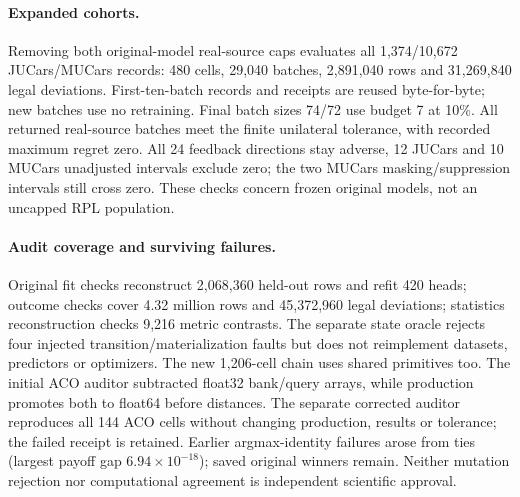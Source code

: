 \documentclass[11pt]{article}
\begin{document}
\paragraph{Expanded cohorts.}
Removing both original-model real-source caps evaluates all 1,374/10,672
JUCars/MUCars records: 480 cells, 29,040 batches, 2,891,040 rows and
31,269,840 legal deviations. First-ten-batch records and receipts are reused
byte-for-byte; new batches use no retraining. Final batch sizes 74/72 use
budget 7 at 10\%. All returned real-source batches meet the finite unilateral
tolerance, with recorded maximum regret zero. All 24 feedback directions stay
adverse, 12 JUCars and 10 MUCars unadjusted intervals exclude zero; the two
MUCars masking/suppression intervals still cross zero. These checks concern
frozen original models, not an uncapped RPL population.

\paragraph{Audit coverage and surviving failures.}
Original fit checks reconstruct 2,068,360 held-out rows and refit 420 heads;
outcome checks cover 4.32 million rows and 45,372,960 legal deviations;
statistics reconstruction checks 9,216 metric contrasts. The separate state
oracle rejects four injected transition/materialization faults but does not
reimplement datasets, predictors or optimizers. The new 1,206-cell chain uses
shared primitives too. The initial ACO auditor subtracted float32 bank/query
arrays, while production promotes both to float64 before distances. The
separate corrected auditor reproduces all 144 ACO cells without changing
production, results or tolerance; the failed receipt is retained. Earlier
argmax-identity failures arose from ties (largest payoff gap
$6.94\times10^{-18}$); saved original winners remain. Neither mutation
rejection nor computational agreement is independent scientific approval.
\end{document}

